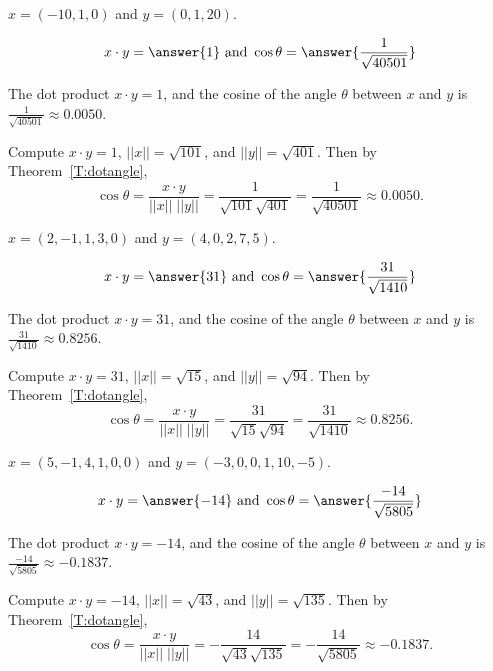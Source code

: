 \documentclass{ximera}
\begin{document}
\begin{exercise} \label{c1.4.9d}
  $x=(-10,1,0)$ and $y=(0,1,20)$.
    \begin{prompt}
    \[x \cdot y = \answer{1} \mbox{ and }
    \cos \theta = \answer{\frac{1}{\sqrt{40501}}}\]
  \end{prompt}

\begin{solution}
\ans The dot product $x \cdot y = 1$, and the cosine
of the angle $\theta$ between $x$ and $y$ is
$\frac{1}{\sqrt{40501}} \approx 0.0050$.

\soln Compute $x \cdot y = 1$, $||x|| = \sqrt{101}$, and $||y|| = \sqrt{401}$.
Then by Theorem~\ref{T:dotangle},
\[
\cos\theta = \frac{x \cdot y}{||x||\;||y||} = \frac{1}{\sqrt{101}\sqrt{401}}
= \frac{1}{\sqrt{40501}} \approx 0.0050.
\]

\end{solution}
\end{exercise}
\begin{exercise} \label{c1.4.9e}
  $x=(2,-1,1,3,0)$ and $y=(4,0,2,7,5)$.
      \begin{prompt}
    \[x \cdot y = \answer{31} \mbox{ and }
    \cos \theta = \answer{\frac{31}{\sqrt{1410}}}\]
  \end{prompt}

\begin{solution}
\ans The dot product $x \cdot y = 31$, and the cosine
of the angle $\theta$ between $x$ and $y$ is
$\frac{31}{\sqrt{1410}} \approx 0.8256$.

\soln Compute $x \cdot y = 31$, $||x|| = \sqrt{15}$, and $||y|| = \sqrt{94}$.
Then by Theorem~\ref{T:dotangle},
\[
\cos\theta = \frac{x \cdot y}{||x||\;||y||} = \frac{31}{\sqrt{15}\sqrt{94}}
= \frac{31}{\sqrt{1410}} \approx 0.8256.
\]

\end{solution}
\end{exercise}
\begin{exercise} \label{c1.4.9f}
  $x=(5,-1,4,1,0,0)$ and $y=(-3,0,0,1,10,-5)$.
      \begin{prompt}
    \[x \cdot y = \answer{-14} \mbox{ and }
    \cos \theta = \answer{\frac{-14}{\sqrt{5805}}}\]
  \end{prompt}
  

\begin{solution}
\ans The dot product $x \cdot y = -14$, and the cosine
of the angle $\theta$ between $x$ and $y$ is
$\frac{-14}{\sqrt{5805}} \approx -0.1837$.

\soln Compute $x \cdot y = -14$, $||x|| = \sqrt{43}$, and $||y|| = \sqrt{135}$.
Then by Theorem~\ref{T:dotangle},
\[
\cos\theta = \frac{x \cdot y}{||x||\;||y||} = -\frac{14}{\sqrt{43}\sqrt{135}}
= -\frac{14}{\sqrt{5805}} \approx -0.1837.
\]

\end{solution}
\end{exercise}
\end{document}
